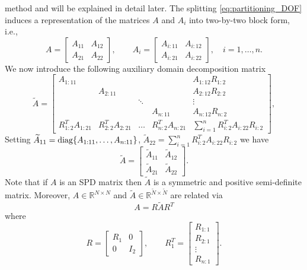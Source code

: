 \documentclass[11pt]{amsart}
\numberwithin{equation}{section}
\theoremstyle{definition}\newtheorem{example}{Example}[section]
\begin{document}
method and will be explained in detail later.
The splitting 
\eqref{eq:partitioning_DOF} induces a representation of the matrices $A$ and
$A_{i}$ into two-by-two block form, i.e.,
\begin{equation}\label{eq:A_two_by_two-x}
A=\left[
        \begin{array}{cc}
        A_{11} & A_{12} \\
        A_{21} & A_{22}
        \end{array}
\right],\qquad
 A_{i}=\left[
        \begin{array}{cc}
        A_{i:11} & A_{i:12} \\
        A_{i:21} & A_{i:22}
        \end{array}
\right], \quad i=1,\dots,n.
\end{equation}
We now introduce the following auxiliary domain decomposition matrix
\begin{equation}\label{eq:auxA}
\widetilde{A}=
\left[ \begin{array}{ccccc}
A_{1:11} &&&& A_{1:12} R_{1:2} \\[0.5ex]
& A_{2:11} &&& A_{2:12} R_{2:2} \\[0.5ex]
&& \ddots && \vdots \\[0.5ex]
&&& A_{{n}:11} & A_{{n}:12} R_{n:2} \\[0.5ex]
R_{1:2}^T A_{1:21} & R_{2:2}^T A_{2:21} & \hdots & R^T_{n:2} A_{{n}:21} 
& \displaystyle \sum_{i=1}^{n} R^T_{i:2} A_{i:22} R_{i:2}
                \end{array}
\right] ,
\end{equation}
Setting 
$\widetilde{A}_{11}={\rm diag}\{A_{1:11}, \ldots, A_{{n}:11}\}$,
$\widetilde{A}_{22}=\sum_{i=1}^{n} R^T_{i:2} A_{i:22} R_{i:2}$ we have 
\begin{equation}\label{eq:A_two_by_two}
\widetilde{A}=\left[
        \begin{array}{cc}
        \widetilde{A}_{11} & \widetilde{A}_{12} \\
        \widetilde{A}_{21} & \widetilde{A}_{22}
        \end{array}
\right].
\end{equation}
Note that if $A$ is an SPD matrix then $\widetilde{A}$ is a symmetric and positive semi-definite matrix.
Moreover, $A \in {{\mathbb{R}}^{{N{\times}N}}}$ and
$\widetilde{A} \in {{\mathbb{R}}^{{\widetilde{N}{\times}\widetilde{N}}}}$
are related via
\begin{equation}
A=R \widetilde{A} R^T 
\end{equation}
where
\begin{equation}\label{eq:R}
R=\left[ \begin{array}{cc}
           R_1 & 0 \\ 0 & I_2
           \end{array}
\right] , \qquad
R_1^T=\left[ \begin{array}{c}
           R_{1:1} \\ R_{2:1} \\ \vdots \\ R_{n:1}
           \end{array}
\right] .
\end{equation}
\end{document}
